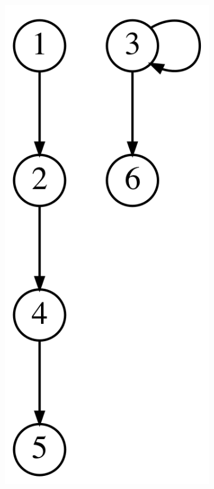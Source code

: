 \begin{figure}[t!]
\begin{subfigure}[b]{0.1\textwidth}
        \includegraphics[width=\textwidth]{./sezione3/experimental_results/plots/hopcroft_graph_1.png}

\end{subfigure}
\end{figure}

